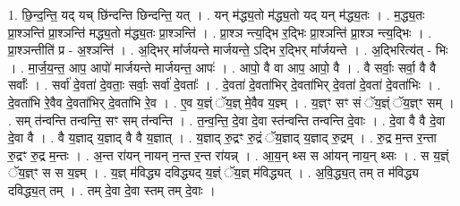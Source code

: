 \documentclass[17pt]{extarticle}
\begin{document}
1. छि॒न्द॒न्ति॒ यद् यच् छि॑न्दन्ति छिन्दन्ति॒ यत् । . यन् म॑द्ध्य॒तो म॑द्ध्य॒तो यद् यन् म॑द्ध्य॒तः । . म॒द्ध्य॒तः प्रा॒श्ञन्ति॑ प्रा॒श्ञन्ति॑ मद्ध्य॒तो म॑द्ध्य॒तः प्रा॒श्ञन्ति॑ । . प्रा॒श्ञ न्त्य॒द्भि र॒द्भिः प्रा॒श्ञन्ति॑ प्रा॒श्ञ न्त्य॒द्भिः । . प्रा॒श्ञन्तीति॑ प्र - अ॒श्ञन्ति॑ । . अ॒द्भिर् मा᳚र्जयन्ते मार्जयन्ते॒ ऽद्भि र॒द्भिर् मा᳚र्जयन्ते । . अ॒द्भिरित्य॑त् - भिः । . मा॒र्ज॒य॒न्त॒ आप॒ आपो॑ मार्जयन्ते मार्जयन्त॒ आपः॑ । . आपो॒ वै वा आप॒ आपो॒ वै । . वै सर्वाः॒ सर्वा॒ वै वै सर्वाः᳚ । . सर्वा॑ दे॒वता॑ दे॒वताः॒ सर्वाः॒ सर्वा॑ दे॒वताः᳚ । . दे॒वता॑ दे॒वता॑भिर् दे॒वता॑भिर् दे॒वता॑ दे॒वता॑ दे॒वता॑भिः । . दे॒वता॑भि रे॒वैव दे॒वता॑भिर् दे॒वता॑भि रे॒व । . ए॒व य॒ज्ञ्ं ॅय॒ज्ञ् मे॒वैव य॒ज्ञ्म् । . य॒ज्ञ्ꣳ सꣳ सं ॅय॒ज्ञ्ं ॅय॒ज्ञ्ꣳ सम् । . सम् त॑न्वन्ति तन्वन्ति॒ सꣳ सम् त॑न्वन्ति । . त॒न्व॒न्ति॒ दे॒वा दे॒वा स्त॑न्वन्ति तन्वन्ति दे॒वाः । . दे॒वा वै वै दे॒वा दे॒वा वै । . वै य॒ज्ञाद् य॒ज्ञाद् वै वै य॒ज्ञात् । . य॒ज्ञाद् रु॒द्रꣳ रु॒द्रं ॅय॒ज्ञाद् य॒ज्ञाद् रु॒द्रम् । . रु॒द्र म॒न्त र॒न्ता रु॒द्रꣳ रु॒द्र म॒न्तः । . अ॒न्त रा॑यन् नायन् न॒न्त र॒न्त रा॑यन्न् । . आ॒य॒न् थ्स स आ॑यन् नाय॒न् थ्सः । . स य॒ज्ञ्ं ॅय॒ज्ञ्ꣳ स स य॒ज्ञ्म् । . य॒ज्ञ् म॑विद्ध्य दविद्ध्यद् य॒ज्ञ्ं ॅय॒ज्ञ् म॑विद्ध्यत् । . अ॒वि॒द्ध्य॒त् तम् त म॑विद्ध्य दविद्ध्य॒त् तम् । . तम् दे॒वा दे॒वा स्तम् तम् दे॒वाः । \newline
\end{document}
